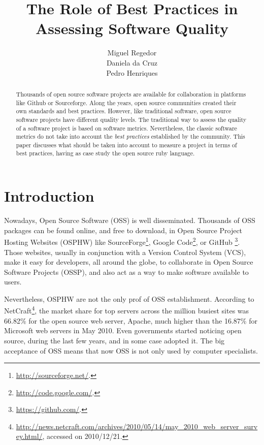 \documentclass[sle]{llncs}
\title{The Role of Best Practices in Assessing Software Quality}
\author{Miguel Regedor\\Daniela da Cruz\\Pedro Henriques}
\institute{Minho University, \email{miguelregedor@gmail.com}}
\begin{document}
\frontmatter  
\pagestyle{headings}
\maketitle
           

\begin{abstract} 
Thousands of open source software projects are available for collaboration in platforms like Github or Sourceforge.
Along the years, open source communities created their own standards and best practices.
However, like traditional software, open source software projects have different quality levels. 
The traditional way to assess the quality of a software project is based on software metrics.
Nevertheless, the classic software metrics do not take into account the \emph{best practices} established by the community.
This paper discusses what should be taken into account to measure a project in terms of best practices,
having as case study the open source ruby language.
\end{abstract}


\section{Introduction}
Nowadays, Open Source Software (OSS) is well disseminated.
Thousands of OSS packages can be found online, and free to download, 
in Open Source Project Hosting Websites (OSPHW) like 
\textsf{SourceForge}\footnote{\url{http://sourceforge.net/}.},
\textsf{Google Code}\footnote{\url{http://code.google.com/}.}, or 
\textsf{GitHub     }\footnote{\url{https://github.com/}.}.
Those websites, usually in conjunction with a Version Control System (VCS), make it easy for developers, all around the globe, 
to collaborate in Open Source Software Projects (OSSP), and also act as a way to make software available to users. 

Nevertheless, OSPHW are not the only prof of OSS establishment.
According to \textsf{NetCraft}\footnote{\url{http://news.netcraft.com/archives/2010/05/14/may\_2010\_web\_server\_survey.html/}, accessed on 2010/12/21.},
the market share for top servers across the million busiest sites was 66.82\% for the open source web server, Apache, 
much higher than the 16.87\% for Microsoft web servers in May 2010.
Even governments started noticing open source, during the last few years, and in some case adopted it\cite{hahn2002government}.
The big acceptance of OSS means that now OSS is not only used by computer specialists. 
\end{document}
